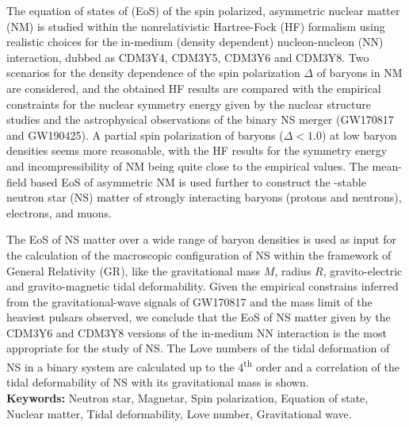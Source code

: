 The equation of states of (\gls{EoS}) of the spin polarized, asymmetric nuclear matter (\gls{NM}) 
is studied within the nonrelativistic Hartree-Fock (\gls{HF}) formalism using realistic choices 
for the in-medium (density dependent) nucleon-nucleon (\gls{NN}) interaction, dubbed as CDM3Y4, CDM3Y5, 
CDM3Y6 and CDM3Y8. Two scenarios for the density dependence of the spin polarization $\Delta$ 
of baryons in NM are considered, and the obtained HF results are compared with the empirical 
constraints for the nuclear symmetry energy given by the nuclear structure studies and the 
astrophysical observations of the binary NS merger (GW170817 and GW190425). A partial spin 
polarization of baryons ($\Delta < 1.0$) at low baryon densities seems more reasonable, with 
the HF results for the symmetry energy and incompressibility of NM being quite close to the 
empirical values. The mean-field based EoS of asymmetric NM is used further to construct 
the \textbeta-stable neutron star (\gls{NS}) matter of strongly interacting baryons (protons 
and neutrons), electrons, and muons.

The EoS of NS matter over a wide range of baryon densities is used as input for the calculation 
of the macroscopic configuration of \gls{NS} within the framework of General Relativity (\gls{GR}), 
like the gravitational mass $M$, radius $R$, gravito-electric and gravito-magnetic tidal deformability. 
Given the empirical constrains inferred from the gravitational-wave signals of GW170817 and the mass 
limit of the heaviest pulsars observed, we conclude that the EoS of NS matter given by the CDM3Y6 
and CDM3Y8 versions of the in-medium NN interaction is the most appropriate for the study of NS. 
The Love numbers of the tidal deformation of \gls{NS} in a binary system are calculated up 
to the 4\textsuperscript{th} order and a correlation of the tidal deformability of NS with 
its gravitational mass is shown. \\ [5mm]
\textbf{Keywords:} Neutron star, Magnetar, Spin polarization, Equation of state, Nuclear matter, 
Tidal deformability, Love number, Gravitational wave.

